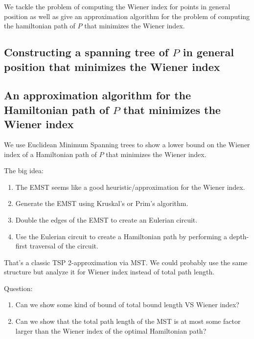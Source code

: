 \documentclass{article}
\begin{document}
We tackle the problem of computing the Wiener index for points in general position as well as give an approximation algorithm for the problem of computing the hamiltonian path of $P$ that minimizes the Wiener index.

\subsection{Constructing a spanning tree of $P$ in general position that minimizes the Wiener index}

\subsection{An approximation algorithm for the Hamiltonian path of $P$ that minimizes the Wiener index}

We use Euclidean Minimum Spanning trees to show a lower bound on the Wiener index of a Hamiltonian path of $P$ that minimizes the Wiener index.

The big idea:
\begin{enumerate}
	\item The EMST seems like a good heuristic/approximation for the Wiener index.
	\item Generate the EMST using Kruskal's or Prim's algorithm.
	\item Double the edges of the EMST to create an Eulerian circuit.
	\item Use the Eulerian circuit to create a Hamiltonian path by performing a depth-first traversal of the circuit.
\end{enumerate}

That's a classic TSP 2-approximation via MST. We could probably use the same structure but analyze it for Wiener index instead of total path length.

Question:
\begin{enumerate}
	\item Can we show some kind of bound of total bound length VS Wiener index?
	\item Can we show that the total path length of the MST is at most some factor larger than the Wiener index of the optimal Hamiltonian path?
\end{enumerate}
\end{document}
